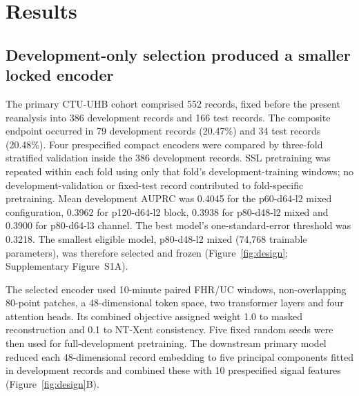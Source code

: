 \documentclass[utf8]{FrontiersinHarvard}
\begin{document}
\section{Results}

\subsection{Development-only selection produced a smaller locked encoder}

The primary CTU-UHB cohort comprised 552 records, fixed before the present reanalysis into 386 development records and 166 test records. The composite endpoint occurred in 79 development records (20.47\%) and 34 test records (20.48\%). Four prespecified compact encoders were compared by three-fold stratified validation inside the 386 development records. SSL pretraining was repeated within each fold using only that fold's development-training windows; no development-validation or fixed-test record contributed to fold-specific pretraining. Mean development AUPRC was 0.4045 for the p60-d64-l2 mixed configuration, 0.3962 for p120-d64-l2 block, 0.3938 for p80-d48-l2 mixed and 0.3900 for p80-d64-l3 channel. The best model's one-standard-error threshold was 0.3218. The smallest eligible model, p80-d48-l2 mixed (74,768 trainable parameters), was therefore selected and frozen (Figure~\ref{fig:design}; Supplementary Figure~S1A).

The selected encoder used 10-minute paired FHR/UC windows, non-overlapping 80-point patches, a 48-dimensional token space, two transformer layers and four attention heads. Its combined objective assigned weight 1.0 to masked reconstruction and 0.1 to NT-Xent consistency. Five fixed random seeds were then used for full-development pretraining. The downstream primary model reduced each 48-dimensional record embedding to five principal components fitted in development records and combined these with 10 prespecified signal features (Figure~\ref{fig:design}B).
\end{document}
